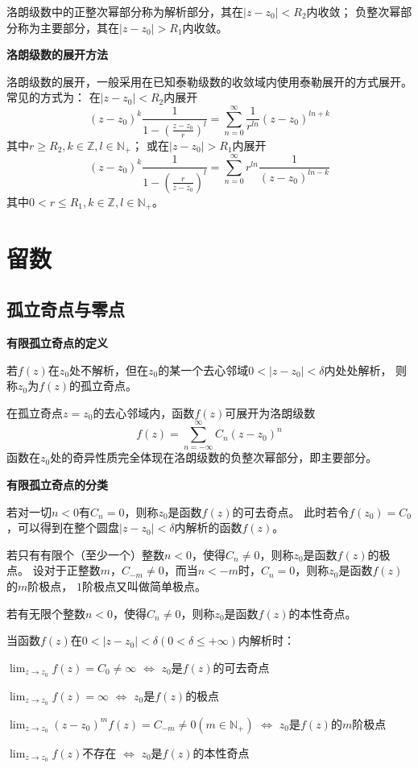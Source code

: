 \documentclass[a4paper,12pt]{article}
\begin{document}
洛朗级数中的正整次幂部分称为解析部分，其在$\left|z-z_0\right|<R_2$内收敛；
负整次幂部分称为主要部分，其在$\left|z-z_0\right|>R_1$内收敛。

\noindent
\textbf{洛朗级数的展开方法}

洛朗级数的展开，一般采用在已知泰勒级数的收敛域内使用泰勒展开的方式展开。常见的方式为：
在$\left|z-z_0\right|<R_2$内展开
$$
\left(z-z_0\right)^k\frac1{1-\left(\frac{z-z_0}{r}\right)^l}=
\sum_{n=0}^\infty \frac1{r^{ln}}\left(z-z_0\right)^{ln+k}
$$
其中$r\ge R_2,k\in\mathbb{Z},l\in\mathbb{N}_+$；
或在$\left|z-z_0\right|>R_1$内展开
$$
\left(z-z_0\right)^k\frac1{1-\left(\frac{r}{z-z_0}\right)^l}=
\sum_{n=0}^\infty r^{ln}\frac1{\left(z-z_0\right)^{ln-k}}
$$
其中$0<r\le R_1,k\in\mathbb{Z},l\in\mathbb{N}_+$。

\section{留数}

\subsection{孤立奇点与零点}

\noindent
\textbf{有限孤立奇点的定义}

若$f\left(z\right)$在$z_0$处不解析，但在$z_0$的某一个去心邻域$0<\left|z-z_0\right|<\delta$内处处解析，
则称$z_0$为$f\left(z\right)$的孤立奇点。

在孤立奇点$z=z_0$的去心邻域内，函数$f\left(z\right)$可展开为洛朗级数
$$
f\left(z\right)=\sum_{n=-\infty}^\infty C_n\left(z-z_0\right)^n
$$
函数在$z_0$处的奇异性质完全体现在洛朗级数的负整次幂部分，即主要部分。

\noindent
\textbf{有限孤立奇点的分类}

若对一切$n<0$有$C_n=0$，则称$z_0$是函数$f\left(z\right)$的可去奇点。
此时若令$f\left(z_0\right)=C_0$，可以得到在整个圆盘$\left|z-z_0\right|<\delta$内解析的函数$f\left(z\right)$。

若只有有限个（至少一个）整数$n<0$，使得$C_n\ne0$，则称$z_0$是函数$f\left(z\right)$的极点。
设对于正整数$m$，$C_{-m}\ne0$，而当$n<-m$时，$C_n=0$，则称$z_0$是函数$f\left(z\right)$的$m$阶极点，
$1$阶极点又叫做简单极点。

若有无限个整数$n<0$，使得$C_n\ne0$，则称$z_0$是函数$f\left(z\right)$的本性奇点。

当函数$f\left(z\right)$在$0<\left|z-z_0\right|<\delta\left(0<\delta\le+\infty\right)$内解析时：
\begin{center}
    $\lim_{z\to z_0}f\left(z\right)=C_0\ne\infty$
    $\Longleftrightarrow$
    $z_0$是$f\left(z\right)$的可去奇点

    $\lim_{z\to z_0}f\left(z\right)=\infty$
    $\Longleftrightarrow$
    $z_0$是$f\left(z\right)$的极点

    $\lim_{z\to z_0}\left(z-z_0\right)^mf\left(z\right)=C_{-m}\ne0\left(m\in\mathbb{N}_+\right)$
    $\Longleftrightarrow$
    $z_0$是$f\left(z\right)$的$m$阶极点

    $\lim_{z\to z_0}f\left(z\right)$不存在
    $\Longleftrightarrow$
    $z_0$是$f\left(z\right)$的本性奇点
\end{center}
\end{document}
